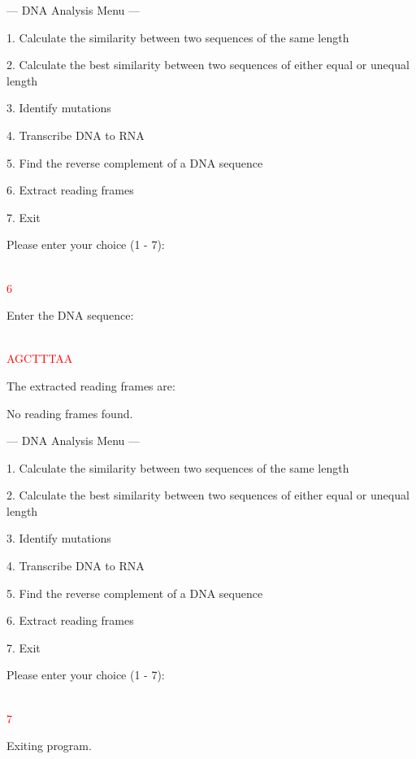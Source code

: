 \begin{sample}

    --- DNA Analysis Menu ---
    
    1. Calculate the similarity between two sequences of the same length
    
    2. Calculate the best similarity between two sequences of either equal or unequal length
    
    3. Identify mutations
    
    4. Transcribe DNA to RNA
    
    5. Find the reverse complement of a DNA sequence
    
    6. Extract reading frames
    
    7. Exit
    
    Please enter your choice (1 - 7): 
    
    \\\textcolor{red}{6}

    Enter the DNA sequence: 

    \\\textcolor{red}{AGCTTTAA}

    The extracted reading frames are: 

    No reading frames found.

    --- DNA Analysis Menu ---
    
    1. Calculate the similarity between two sequences of the same length
   
    2. Calculate the best similarity between two sequences of either equal or unequal length
    
    3. Identify mutations
    
    4. Transcribe DNA to RNA
    
    5. Find the reverse complement of a DNA sequence
    
    6. Extract reading frames
    
    7. Exit
    
    Please enter your choice (1 - 7): 
    
    \\\textcolor{red}{7}
    
    Exiting program.
\end{sample}

